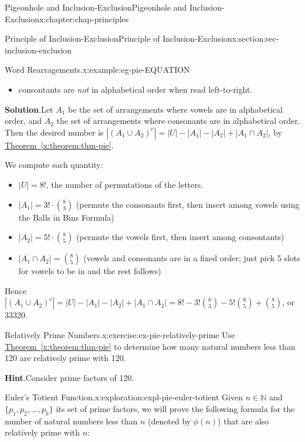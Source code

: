 \documentclass[oneside,10pt,]{book}
\newcommand{\blocktitlefont}{\relax}
\newcommand{\xreffont}{\relax}
\numberwithin{equation}{section}
\begin{document}
\begin{chapterptx}{Pigeonhole and Inclusion-Exclusion}{}{Pigeonhole and Inclusion-Exclusion}{}{}{x:chapter:chap-principles}
\begin{sectionptx}{Principle of Inclusion-Exclusion}{}{Principle of Inclusion-Exclusion}{}{}{x:section:sec-inclusion-exclusion}
\begin{example}{Word Rearragements.}{x:example:eg-pie-EQUATION}
\begin{itemize}[label=\textbullet]
\item{}consontants are \emph{not} in alphabetical order when read left-to-right.%
\end{itemize}
%
\par\smallskip%
\noindent\textbf{\blocktitlefont Solution}.\hypertarget{g:solution:id464192}{}\quad{}Let \(A_1\) be the set of arrangements where vowels are in alphabetical order, and \(A_2\) the set of arrangements where consonants are in alphabetical order. Then the desired number is \(|(A_1 \cup A_2)^c| = |U| - |A_1| - |A_2| + |A_1 \cap A_2|\), by \hyperref[x:theorem:thm-pie]{Theorem~{\xreffont\ref{x:theorem:thm-pie}}}.%
\par
We compute each quantity:%
\begin{itemize}[label=\textbullet]
\item{}\(|U| = 8!\), the number of permutations of the letters.%
\item{}\(|A_1| = 3! \cdot \binom{8}{3}\) (permute the consonants first, then insert among vowels using the Balls in Bins Formula)%
\item{}\(|A_2| = 5! \cdot \binom{8}{5}\) (permute the vowels first, then insert among consontants)%
\item{}\(|A_1 \cap A_2| = \binom{8}{5}\) (vowels and consonants are in a fixed order; just pick 5 slots for vowels to be in and the rest follows)%
\end{itemize}
%
\par
Hence \(|(A_1 \cup A_2)^c| = |U| - |A_1| - |A_2| + |A_1 \cap A_2| = 8! - 3!\binom{8}{3} - 5!\binom{8}{5} + \binom{8}{5}\), or 33320.%
\end{example}
\begin{inlineexercise}{Relatively Prime Numbers.}{x:exercise:ex-pie-relatively-prime}%
Use \hyperref[x:theorem:thm-pie]{Theorem~{\xreffont\ref{x:theorem:thm-pie}}} to determine how many natural numbers less than 120 are relatively prime with 120.%
\par\smallskip%
\noindent\textbf{\blocktitlefont Hint}.\hypertarget{g:hint:id464428}{}\quad{}Consider prime factors of 120.%
\end{inlineexercise}
\begin{exploration}{Euler's Totient Function.}{x:exploration:expl-pie-euler-totient}%
Given \(n \in \mathbb{N}\) and \(\{p_1,p_2,\ldots,p_k\}\) its set of prime factors, we will prove the following formula for the number of natural numbers less than \(n\) (denoted by \(\phi(n)\)) that are also relatively prime with \(n\):%
\begin{equation*}

\end{equation*}
\end{exploration}
\end{sectionptx}
\end{chapterptx}
\end{document}
